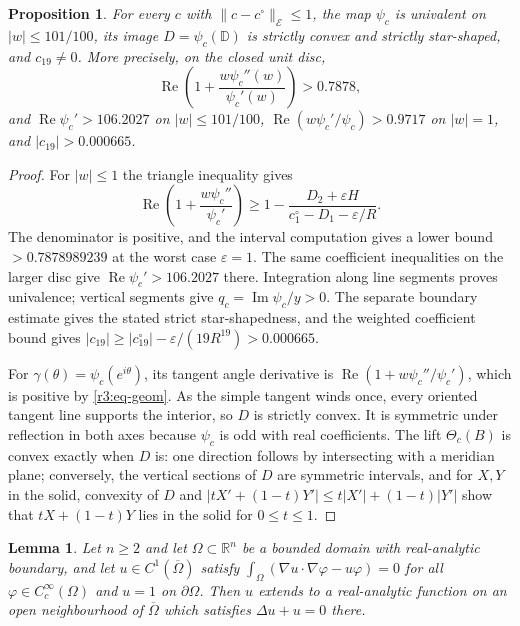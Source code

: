 \documentclass[11pt]{amsart}
\newtheorem{proposition}[theorem]{Proposition}
\newtheorem{lemma}[theorem]{Lemma}
\theoremstyle{definition}
\theoremstyle{remark}
\numberwithin{equation}{section}
\newcommand{\R}{\mathbb{R}}
\newcommand{\D}{\mathbb{D}}
\DeclareMathOperator{\re}{Re}
\DeclareMathOperator{\im}{Im}
\newcommand{\nrm}[1]{\lVert #1\rVert}
\begin{document}
\begin{proposition}\label{r3:prop-geometry}
For every $c$ with $\nrm{c-c^\circ}_{\mathcal E}\leq1$, the map $\psi_c$ is univalent on $|w|\leq101/100$, its image $D=\psi_c(\D)$ is strictly convex and strictly star-shaped, and $c_{19}\ne0$. More precisely, on the closed unit disc,
\begin{equation}\label{r3:eq-geom}
\re\left(1+\frac{w\psi_c''(w)}{\psi_c'(w)}\right)>0.7878,
\end{equation}
and $\re\psi_c'>106.2027$ on $|w|\leq101/100$, $\re(w\psi_c'/\psi_c)>0.9717$ on $|w|=1$, and $|c_{19}|>0.000665$.
\end{proposition}
\begin{proof}
For $|w|\leq1$ the triangle inequality gives
\[
\re\left(1+\frac{w\psi_c''}{\psi_c'}\right)
\geq1-\frac{D_2+\varepsilon H}{c_1^\circ-D_1-\varepsilon/R}.
\]
The denominator is positive, and the interval computation gives a lower bound $>0.7878989239$ at the worst case $\varepsilon=1$. The same coefficient inequalities on the larger disc give $\re\psi_c'>106.2027$ there. Integration along line segments proves univalence; vertical segments give $q_c=\im\psi_c/y>0$. The separate boundary estimate gives the stated strict star-shapedness, and the weighted coefficient bound gives $|c_{19}|\geq|c_{19}^\circ|-\varepsilon/(19R^{19})>0.000665$.

For $\gamma(\theta)=\psi_c(e^{i\theta})$, its tangent angle derivative is $\re(1+w\psi_c''/\psi_c')$, which is positive by \eqref{r3:eq-geom}. As the simple tangent winds once, every oriented tangent line supports the interior, so $D$ is strictly convex. It is symmetric under reflection in both axes because $\psi_c$ is odd with real coefficients. The lift $\Theta_c(B)$ is convex exactly when $D$ is: one direction follows by intersecting with a meridian plane; conversely, the vertical sections of $D$ are symmetric intervals, and for $X,Y$ in the solid, convexity of $D$ and $|tX'+(1-t)Y'|\leq t|X'|+(1-t)|Y'|$ show that $tX+(1-t)Y$ lies in the solid for $0\leq t\leq1$.
\end{proof}

\begin{lemma}\label{r3:lem-regularity}
Let $n\ge2$ and let $\Omega\subset\R^n$ be a bounded domain with real-analytic boundary, and let $u\in C^1(\overline\Omega)$ satisfy $\int_\Omega(\nabla u\cdot\nabla\varphi-u\varphi)=0$ for all $\varphi\in C_c^\infty(\Omega)$ and $u=1$ on $\partial\Omega$. Then $u$ extends to a real-analytic function on an open neighbourhood of $\overline\Omega$ which satisfies $\Delta u+u=0$ there.
\end{lemma}
\end{document}
